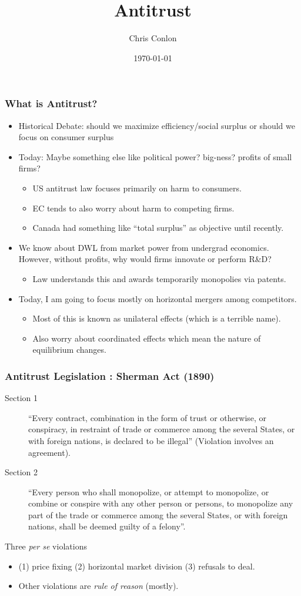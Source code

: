 \documentclass[aspectratio=169,10pt]{beamer}
\title{Antitrust}
\author{Chris Conlon}
\institute{Grad IO}
\date{\today}
\begin{document}
\frame{\titlepage}

\begin{frame}
\frametitle{What is Antitrust?}
 \begin{itemize}
\item Historical Debate: should we maximize \alert{efficiency/social surplus} or should we focus on \alert{consumer surplus}
\item Today: Maybe something else like political power? big-ness? profits of small firms?
\begin{itemize}
\item US antitrust law focuses primarily on harm to consumers.
\item EC tends to also worry about harm to competing firms.
\item Canada had something like ``total surplus'' as objective until recently. 
 \end{itemize}
 \item We know about DWL from market power from undergrad economics. However, without profits, why would firms innovate or perform R\&D?
 \begin{itemize}
\item Law understands this and awards temporarily monopolies via patents.
 \end{itemize}
\item Today, I am going to focus mostly on \alert{horizontal mergers} among competitors.
\begin{itemize}
\item Most of this is known as \alert{unilateral effects} (which is a terrible name).
\item Also worry about \alert{coordinated effects} which mean the nature of equilibrium changes.
 \end{itemize}
 \end{itemize}
\end{frame}

\begin{frame}
\frametitle{Antitrust Legislation : Sherman Act (1890)}
 \begin{description}
\item [Section 1]``Every contract, combination in the form of trust or otherwise, or conspiracy, in restraint of trade or commerce among the several States, or with foreign nations, is declared to be illegal'' (Violation involves an \alert{agreement}).
\item [Section 2] ``Every person who shall monopolize, or attempt to monopolize, or combine or conspire with any other person or persons, to monopolize any part of the trade or commerce among the several States, or with foreign nations, shall be deemed guilty of a felony''.
 \end{description}
 Three \textit{per se} violations
 \begin{itemize}
 \item (1) price fixing (2) horizontal market division (3) refusals to deal.
 \item Other violations are \textit{rule of reason} (mostly).
 \end{itemize}
 
\end{frame}
\end{document}
